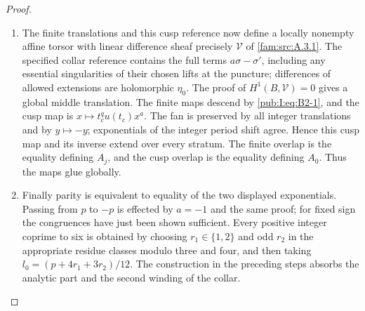 \begin{proof}
\begin{enumerate}[label=\arabic*.,leftmargin=*]
\item The finite translations and this cusp reference now define a locally nonempty affine torsor with linear difference sheaf precisely $\mathcal V$ of \ref{fam:src:A.3.1}. The specified collar reference contains the full terms $a\sigma-\sigma'$, including any essential singularities of their chosen lifts at the puncture; differences of allowed extensions are holomorphic $\eta_0$. The proof of $H^1(B,\mathcal V)=0$ gives a global middle translation. The finite maps descend by \eqref{pub:I:eq:B2-1}, and the cusp map is $x\mapsto t_c^qu(t_c)x^a$. The fan is preserved by all integer translations and by $y\mapsto-y$; exponentials of the integer period shift agree. Hence this cusp map and its inverse extend over every stratum. The finite overlap is the equality defining $A_j$, and the cusp overlap is the equality defining $A_0$. Thus the maps glue globally.

\item Finally parity is equivalent to equality of the two displayed exponentials. Passing from $p$ to $-p$ is effected by $a=-1$ and the same proof; for fixed sign the congruences have just been shown sufficient. Every positive integer coprime to six is obtained by choosing $r_1\in\{1,2\}$ and odd $r_2$ in the appropriate residue classes modulo three and four, and then taking $l_0=(p+4r_1+3r_2)/12$. The construction in the preceding steps absorbs the analytic part and the second winding of the collar.
\end{enumerate}
\end{proof}
